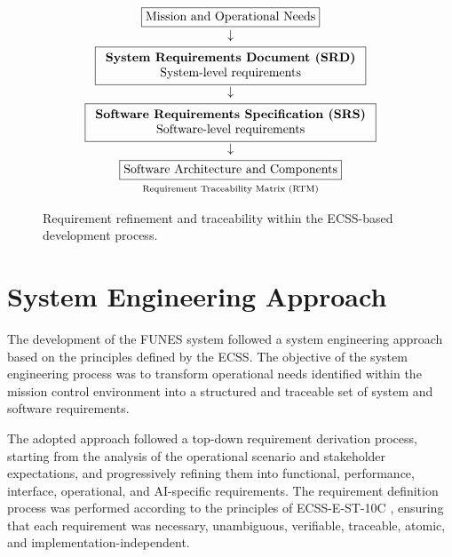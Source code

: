 \begin{figure}[htbp]
    \centering
    \[
    \begin{array}{c}
        \boxed{\text{Mission and Operational Needs}}
        \\[0.1cm]
        \downarrow
        \\[0.1cm]
        \boxed{
        \begin{array}{c}
            \textbf{System Requirements Document (SRD)}\\
            \text{System-level requirements}
        \end{array}}
        \\[0.1cm]
        \downarrow
        \\[0.1cm]
        \boxed{
        \begin{array}{c}
            \textbf{Software Requirements Specification (SRS)}\\
            \text{Software-level requirements}
        \end{array}}
        \\[0.1cm]
        \downarrow
        \\[0.1cm]
        \boxed{\text{Software Architecture and Components}}
        \\[0.1cm]
        \text{\scriptsize Requirement Traceability Matrix (RTM)}
    \end{array}
    \]
    
    \caption{Requirement refinement and traceability within the ECSS-based development process.}
    \label{fig:requirement_flow}
\end{figure}
\section{System Engineering Approach}

The development of the FUNES system followed a system engineering approach based on the principles defined by the ECSS. The objective of the system engineering process was to transform operational needs identified within the mission control environment into a structured and traceable set of system and software requirements.

The adopted approach followed a top-down requirement derivation process, starting from the analysis of the operational scenario and stakeholder expectations, and progressively refining them into functional, performance, interface, operational, and AI-specific requirements. The requirement definition process was performed according to the principles of ECSS-E-ST-10C \cite{ecss-e-st-10c-rev1}, ensuring that each requirement was necessary, unambiguous, verifiable, traceable, atomic, and implementation-independent.


